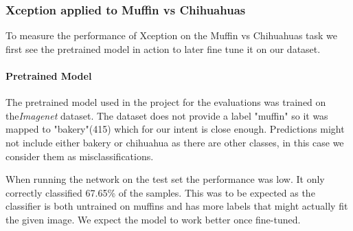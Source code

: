 \subsubsection{Xception applied to Muffin vs Chihuahuas}
\label{subsubsec:xception}

To measure the performance of Xception on the Muffin vs Chihuahuas task we first see the pretrained model in action
to later fine tune it on our dataset.

\paragraph{Pretrained Model} The pretrained model used in the project for the evaluations was trained on the\textit{Imagenet} dataset.
The dataset does not provide a label "muffin" so it was mapped to "bakery"(415) which for our intent is close enough.
Predictions might not include either bakery or chihuahua as there are other classes, in this case we consider them as misclassifications.

When running the network on the test set the performance was low.
It only correctly classified 67.65\% of the samples.
This was to be expected as the classifier is both untrained on muffins and has more labels that might actually fit the given image.
We expect the model to work better once fine-tuned.

